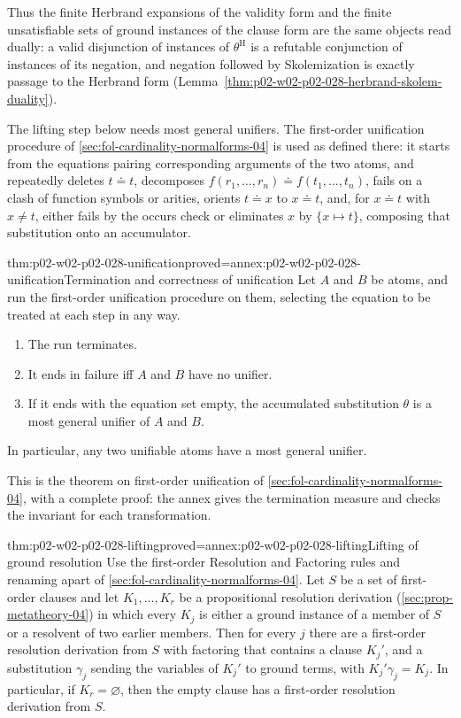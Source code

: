 Thus the finite Herbrand expansions of the validity form and the finite
unsatisfiable sets of ground instances of the clause form are the same
objects read dually: a valid disjunction of instances of
\(\theta^{\mathrm H}\) is a refutable conjunction of instances of its
negation, and negation followed by Skolemization is exactly passage to the
Herbrand form (Lemma~\ref{thm:p02-w02-p02-028-herbrand-skolem-duality}).

The lifting step below needs most general unifiers.  The first-order
unification procedure of \cref{sec:fol-cardinality-normalforms-04} is used as
defined there: it starts from the equations pairing corresponding arguments
of the two atoms, and repeatedly deletes \(t\doteq t\), decomposes
\(f(r_1,\ldots,r_n)\doteq f(t_1,\ldots,t_n)\), fails on a clash of function
symbols or arities, orients \(t\doteq x\) to \(x\doteq t\), and, for
\(x\doteq t\) with \(x\neq t\), either fails by the occurs check or eliminates
\(x\) by \(\{x\mapsto t\}\), composing that substitution onto an accumulator.

\begin{hblemma}{thm:p02-w02-p02-028-unification}{proved=annex:p02-w02-p02-028-unification}{Termination and correctness of unification}
Let \(A\) and \(B\) be atoms, and run the first-order unification procedure
on them, selecting the equation to be treated at each step in any way.
\begin{enumerate}
  \item The run terminates.
  \item It ends in failure iff \(A\) and \(B\) have no unifier.
  \item If it ends with the equation set empty, the accumulated substitution
        \(\theta\) is a most general unifier of \(A\) and \(B\).
\end{enumerate}
In particular, any two unifiable atoms have a most general unifier.
\end{hblemma}

This is the theorem on first-order unification of
\cref{sec:fol-cardinality-normalforms-04}, with a complete proof: the annex
gives the termination measure and checks the invariant for each
transformation.

\begin{hblemma}{thm:p02-w02-p02-028-lifting}{proved=annex:p02-w02-p02-028-lifting}{Lifting of ground resolution}
Use the first-order Resolution and Factoring rules and renaming apart of
\cref{sec:fol-cardinality-normalforms-04}.  Let \(S\) be a set of first-order
clauses and let \(K_1,\ldots,K_r\) be a propositional resolution derivation
(\cref{sec:prop-metatheory-04}) in which every \(K_j\) is either a ground
instance of a member of \(S\) or a resolvent of two earlier members.  Then for
every \(j\) there are a first-order resolution derivation from \(S\) with
factoring that contains a clause \(K_j'\), and a substitution \(\gamma_j\)
sending the variables of \(K_j'\) to ground terms, with
\(K_j'\gamma_j=K_j\).  In particular, if \(K_r=\varnothing\), then the empty
clause has a first-order resolution derivation from \(S\).
\end{hblemma}

